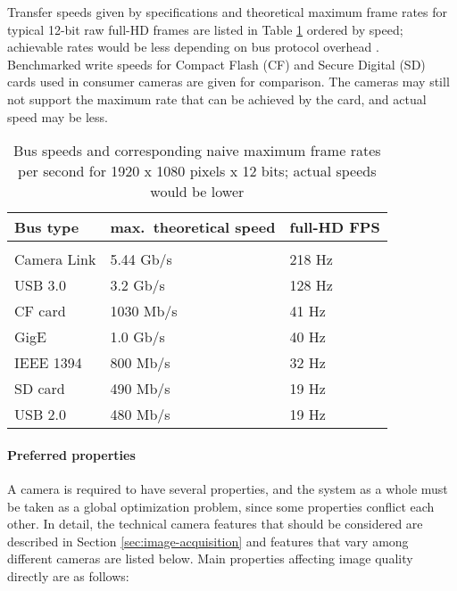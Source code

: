 Transfer speeds given by specifications and theoretical maximum frame rates for typical 12-bit raw full-HD frames are listed in Table \ref{tab:busspeeds} ordered by speed; achievable rates would be less depending on bus protocol overhead \cite{hornberg2007handbook,ni2013choosing}.
Benchmarked \cite{tomshw-sdwrite,tomshw-cfwrite} write speeds for Compact Flash (CF) and Secure Digital (SD) cards used in consumer cameras are given for comparison.
The cameras may still not support the maximum rate that can be achieved by the card, and actual speed may be less.

\begin{table}[t]
	\centering
	\begin{tabular}{l l l}
		Bus type & max.~theoretical speed & full-HD FPS\\
		\hline \\
		Camera Link \cite{ni2013choosing} & 5.44 Gb/s & 218 Hz\\
		USB 3.0 \cite{ni2013choosing} & 3.2 Gb/s & 128 Hz\\
		CF card \cite{tomshw-cfwrite} & 1030 Mb/s & 41 Hz\\
		GigE \cite{ni2013choosing} & 1.0 Gb/s & 40 Hz\\
		IEEE 1394 \cite{ni2013choosing} & 800 Mb/s & 32 Hz\\
		SD card \cite{tomshw-sdwrite} & 490 Mb/s & 19 Hz\\
		USB 2.0 \cite{ni2013choosing} & 480 Mb/s & 19 Hz\\
	\end{tabular}
	\caption{Bus speeds and corresponding naive maximum frame rates per second for 1920 x 1080 pixels x 12 bits; actual speeds would be lower}
	\label{tab:busspeeds}
\end{table}

\paragraph{Preferred properties}
A camera is required to have several properties, and the system as a whole must be taken as a global optimization problem, since some properties conflict each other.
In detail, the technical camera features that should be considered are described in Section \ref{sec:image-acquisition} and features that vary among different cameras are listed below.
Main properties affecting image quality directly are as follows:

